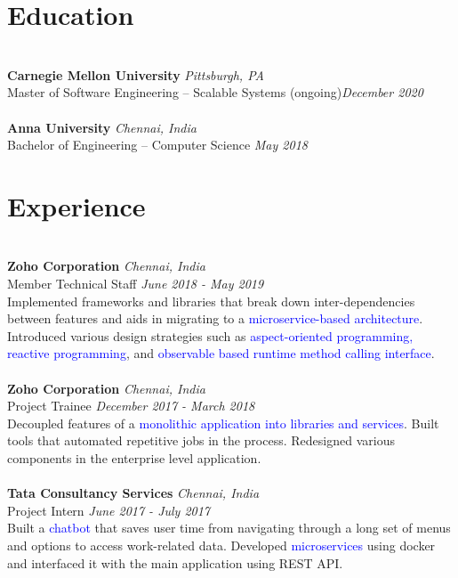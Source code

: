 \documentclass{resume}
\author{https://aravindvasu.dev}{Aravind Vasudevan}
\begin{document}
\maketitle
\section*{Education}
\titlerule
\noindent
\\
\textbf{Carnegie Mellon University} \hfill \textit{Pittsburgh, PA} \\
{\small Master of Software Engineering -- Scalable Systems} (ongoing)\hfill \textit{\small December 2020}  \\
\\
\textbf{Anna University} \hfill \textit{Chennai, India} \\
{\small Bachelor of Engineering -- Computer Science} \hfill \textit{\small May 2018}

\section*{Experience}
\titlerule
\noindent
\\
\textbf{Zoho Corporation} \hfill \textit{Chennai, India} \\
{\small Member Technical Staff} \hfill \textit{\small June 2018 - May 2019}  \\
Implemented frameworks and libraries that break down inter-dependencies between features and aids in migrating to a \textcolor{blue}{microservice-based architecture}. Introduced various design strategies such as \textcolor{blue}{aspect-oriented programming,} \textcolor{blue}{reactive programming}, and \textcolor{blue}{observable based runtime method calling interface}.\\
\\
\textbf{Zoho Corporation} \hfill \textit{Chennai, India} \\
{\small Project Trainee} \hfill \textit{\small December 2017 - March 2018}  \\
Decoupled features of a \textcolor{blue}{monolithic application into libraries and services}. Built tools that automated repetitive jobs in the process. Redesigned various components in the enterprise level application.\\
\\
\textbf{Tata Consultancy Services} \hfill \textit{Chennai, India} \\
{\small Project Intern} \hfill \textit{\small June 2017 - July 2017}  \\
Built a \textcolor{blue}{chatbot} that saves user time from navigating through a long set of menus and options to access work-related data. Developed \textcolor{blue}{microservices} using docker and interfaced it with the main application using REST API.
\end{document}
